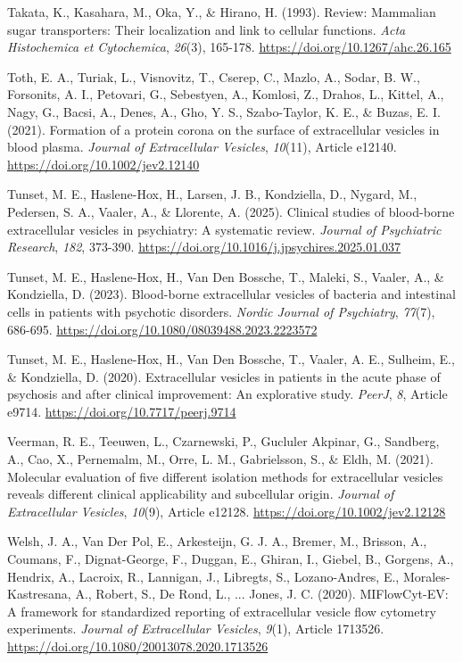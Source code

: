 \documentclass[authordate, empirical]{jote-new-article}
\begin{document}
	Takata, K., Kasahara, M., Oka, Y., \& Hirano, H. (1993). Review: Mammalian sugar transporters: Their localization and link to cellular functions. \emph{Acta Histochemica et Cytochemica},\emph{ 26}(3), 165-178. \url{https://doi.org/10.1267/ahc.26.165}



	Toth, E. A., Turiak, L., Visnovitz, T., Cserep, C., Mazlo, A., Sodar, B. W., Forsonits, A. I., Petovari, G., Sebestyen, A., Komlosi, Z., Drahos, L., Kittel, A., Nagy, G., Bacsi, A., Denes, A., Gho, Y. S., Szabo-Taylor, K. E., \& Buzas, E. I. (2021). Formation of a protein corona on the surface of extracellular vesicles in blood plasma. \emph{Journal of Extracellular Vesicles},\emph{ 10}(11), Article e12140. \url{https://doi.org/10.1002/jev2.12140}



	Tunset, M. E., Haslene-Hox, H., Larsen, J. B., Kondziella, D., Nygard, M., Pedersen, S. A., Vaaler, A., \& Llorente, A. (2025). Clinical studies of blood-borne extracellular vesicles in psychiatry: A systematic review. \emph{Journal of Psychiatric Research},\emph{ 182}, 373-390. \url{https://doi.org/10.1016/j.jpsychires.2025.01.037}



	Tunset, M. E., Haslene-Hox, H., Van Den Bossche, T., Maleki, S., Vaaler, A., \& Kondziella, D. (2023). Blood-borne extracellular vesicles of bacteria and intestinal cells in patients with psychotic disorders. \emph{Nordic Journal of Psychiatry},\emph{ 77}(7), 686-695. \url{https://doi.org/10.1080/08039488.2023.2223572}



	Tunset, M. E., Haslene-Hox, H., Van Den Bossche, T., Vaaler, A. E., Sulheim, E., \& Kondziella, D. (2020). Extracellular vesicles in patients in the acute phase of psychosis and after clinical improvement: An explorative study. \emph{PeerJ},\emph{ 8}, Article e9714. \url{https://doi.org/10.7717/peerj.9714}



	Veerman, R. E., Teeuwen, L., Czarnewski, P., Gucluler Akpinar, G., Sandberg, A., Cao, X., Pernemalm, M., Orre, L. M., Gabrielsson, S., \& Eldh, M. (2021). Molecular evaluation of five different isolation methods for extracellular vesicles reveals different clinical applicability and subcellular origin. \emph{Journal of Extracellular Vesicles},\emph{ 10}(9), Article e12128. \url{https://doi.org/10.1002/jev2.12128}



	Welsh, J. A., Van Der Pol, E., Arkesteijn, G. J. A., Bremer, M., Brisson, A., Coumans, F., Dignat-George, F., Duggan, E., Ghiran, I., Giebel, B., Gorgens, A., Hendrix, A., Lacroix, R., Lannigan, J., Libregts, S., Lozano-Andres, E., Morales-Kastresana, A., Robert, S., De Rond, L., ... Jones, J. C. (2020). MIFlowCyt-EV: A framework for standardized reporting of extracellular vesicle flow cytometry experiments. \emph{Journal of Extracellular Vesicles},\emph{ 9}(1), Article 1713526. \url{https://doi.org/10.1080/20013078.2020.1713526}
\end{document}
